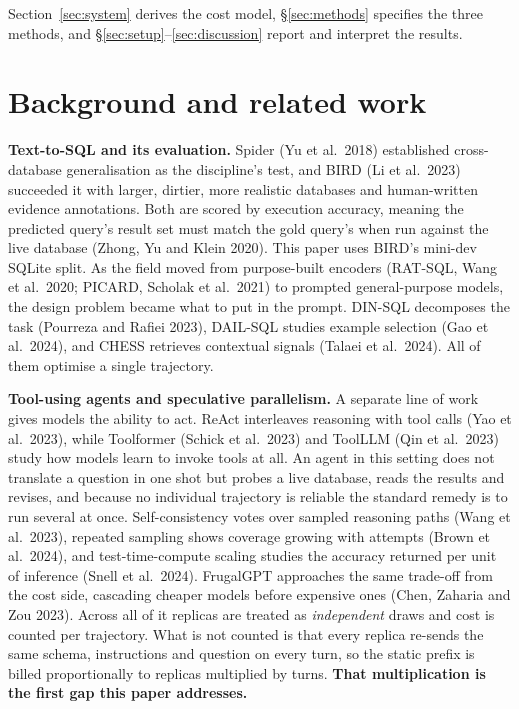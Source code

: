 \documentclass[conference]{IEEEtran}
\begin{document}
Section~\ref{sec:system} derives the cost model, §\ref{sec:methods} specifies
the three methods, and §\ref{sec:setup}--\ref{sec:discussion} report and
interpret the results.

\section{Background and related work}\label{sec:related}

\textbf{Text-to-SQL and its evaluation.} Spider (Yu et al.~2018) established
cross-database generalisation as the discipline's test, and BIRD (Li et
al.~2023) succeeded it with larger, dirtier, more realistic databases and
human-written evidence annotations. Both are scored by execution accuracy, meaning
the predicted query's result set must match the gold query's when run against
the live database (Zhong, Yu and Klein 2020). This paper uses BIRD's mini-dev
SQLite split. As the field moved from purpose-built encoders (RAT-SQL, Wang et
al.~2020; PICARD, Scholak et al.~2021) to prompted general-purpose models, the
design problem became what to put in the prompt. DIN-SQL decomposes the task
(Pourreza and Rafiei 2023), DAIL-SQL studies example selection (Gao et
al.~2024), and CHESS retrieves contextual signals (Talaei et al.~2024). All
of them optimise a single trajectory.

\textbf{Tool-using agents and speculative parallelism.} A separate line of work
gives models the ability to act. ReAct interleaves reasoning with tool calls
(Yao et al.~2023), while Toolformer (Schick et al.~2023) and ToolLLM (Qin et
al.~2023) study how models learn to invoke tools at all. An agent in this
setting does not translate a question in one shot but probes a live database,
reads the results and revises, and because no individual trajectory is reliable
the standard remedy is to run several at once. Self-consistency votes over sampled reasoning paths
(Wang et al.~2023), repeated sampling shows coverage growing with attempts
(Brown et al.~2024), and test-time-compute scaling studies the accuracy returned
per unit of inference (Snell et al.~2024). FrugalGPT
approaches the same trade-off from the cost side, cascading cheaper models
before expensive ones (Chen, Zaharia and Zou 2023). Across all of it replicas
are treated as \emph{independent} draws and cost is counted per trajectory.
What is not counted is that every replica re-sends the same schema,
instructions and question on every turn, so the static prefix is billed
proportionally to replicas multiplied by turns. \textbf{That multiplication is
the first gap this paper addresses.}
\end{document}
